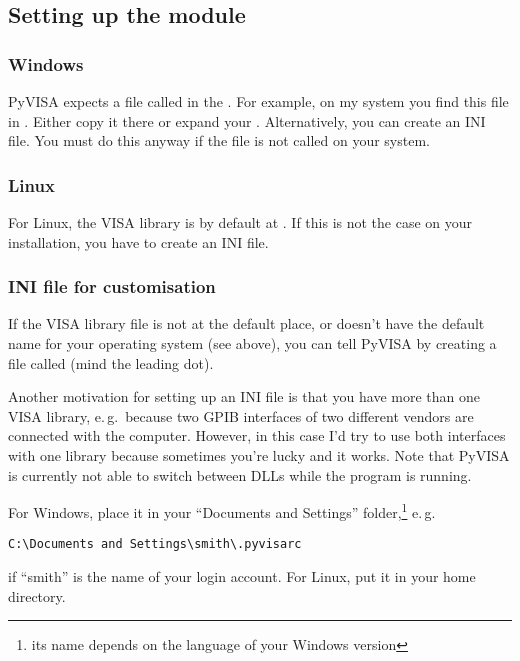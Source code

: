 \documentclass{howto}
\begin{document}
\subsection{Setting up the module}

\subsubsection{Windows}

PyVISA expects a file called  in the \@.  For
example, on my system you find this file in .
Either copy it there or expand your .  Alternatively, you can
create an INI file.  You must do this anyway if the file is not called
 on your system.


\subsubsection{Linux}

For Linux, the VISA library is by default at
.  If this is not the case on
your installation, you have to create an INI file.


\subsubsection{INI file for customisation}

If the VISA library file is not at the default place, or doesn't have the
default name for your operating system (see above), you can tell PyVISA by
creating a file called  (mind the leading dot).

Another motivation for setting up an INI file is that you have more than one
VISA library, e.\,g.\ because two GPIB interfaces of two different vendors are
connected with the computer.  However, in this case I'd try to use both
interfaces with one library because sometimes you're lucky and it works.  Note
that PyVISA is currently not able to switch between DLLs while the program is
running.

For Windows, place it in your ``Documents and Settings'' folder,\footnote{its
  name depends on the language of your Windows version} e.\,g.\
\begin{verbatim}
C:\Documents and Settings\smith\.pyvisarc
\end{verbatim}
if ``smith'' is the name of your login account.  For Linux, put it in your home
directory.
\end{document}
